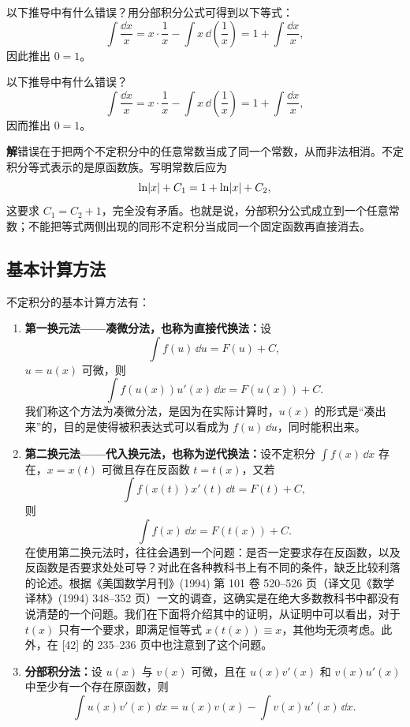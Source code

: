 \begin{xthought}[5]
以下推导中有什么错误？用分部积分公式可得到以下等式：
  \[
    \int\frac{\dd x}{x}
      =x\cdot\frac1x-\int x\,\dd\left(\frac1x\right)
      =1+\int\frac{\dd x}{x},
  \]
  因此推出 $0=1$。
\end{xthought}
\begin{xsolution}
以下推导中有什么错误？
  \[
    \int\frac{\dd x}{x}
    =x\cdot\frac1x-\int x\,\dd\left(\frac1x\right)
    =1+\int\frac{\dd x}{x},
  \]
  因而推出 $0=1$。

  \textbf{解}\quad 错误在于把两个不定积分中的任意常数当成了同一个常数，从而非法相消。不定积分等式表示的是原函数族。写明常数后应为
  \[
    \ln\lvert x\rvert+C_1
    =1+\ln\lvert x\rvert+C_2,
  \]
  这要求 $C_1=C_2+1$，完全没有矛盾。也就是说，分部积分公式成立到一个任意常数；不能把等式两侧出现的同形不定积分当成同一个固定函数再直接消去。
\end{xsolution}


\subsection{基本计算方法}

不定积分的基本计算方法有：

\begin{enumerate}
  \item \textbf{第一换元法——凑微分法，也称为直接代换法：}设
  \[
    \int f(u)\,\dd u=F(u)+C,
  \]
  $u=u(x)$ 可微，则
  \[
    \int f(u(x))u'(x)\,\dd x=F(u(x))+C.
  \]
  我们称这个方法为凑微分法，是因为在实际计算时，$u(x)$ 的形式是“凑出来”的，目的是使得被积表达式可以看成为 $f(u)\,\dd u$，同时能积出来。

  \item \textbf{第二换元法——代入换元法，也称为逆代换法：}设不定积分 $\int f(x)\,\dd x$ 存在，$x=x(t)$ 可微且存在反函数 $t=t(x)$，又若
  \[
    \int f(x(t))x'(t)\,\dd t=F(t)+C,
  \]
  则
  \[
    \int f(x)\,\dd x=F(t(x))+C.
  \]
  在使用第二换元法时，往往会遇到一个问题：是否一定要求存在反函数，以及反函数是否要求处处可导？对此在各种教科书上有不同的条件，缺乏比较利落的论述。根据《美国数学月刊》(1994) 第 101 卷 520--526 页（译文见《数学译林》(1994) 348--352 页）一文的调查，这确实是在绝大多数教科书中都没有说清楚的一个问题。我们在下面将介绍其中的证明，从证明中可以看出，对于 $t(x)$ 只有一个要求，即满足恒等式 $x(t(x))\equiv x$，其他均无须考虑。此外，在 [42] 的 235--236 页中也注意到了这个问题。

  \item \textbf{分部积分法：}设 $u(x)$ 与 $v(x)$ 可微，且在 $u(x)v'(x)$ 和 $v(x)u'(x)$ 中至少有一个存在原函数，则
  \[
    \int u(x)v'(x)\,\dd x=u(x)v(x)-\int v(x)u'(x)\,\dd x.
  \]
\end{enumerate}

